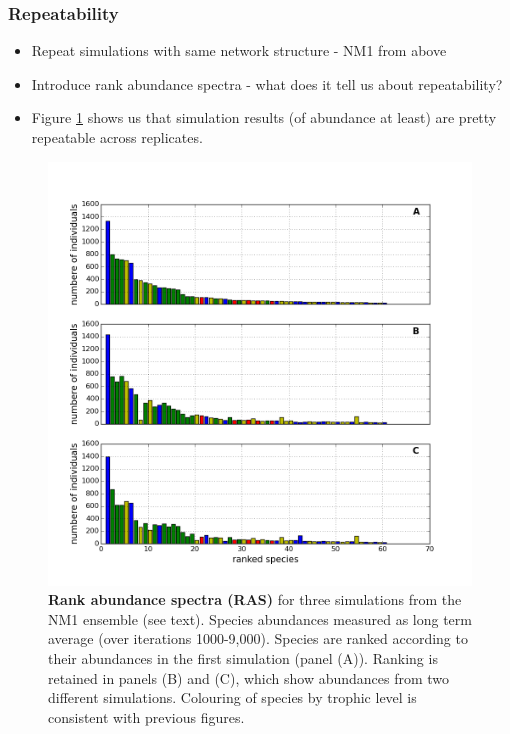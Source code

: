 


\subsubsection{Repeatability}

\begin{itemize}
	\item Repeat simulations with same network structure - NM1 from above
	\item Introduce rank abundance spectra - what does it tell us about repeatability?
	\item Figure \ref{fig:ras_3examples} shows us that simulation results (of abundance at least) are pretty repeatable across replicates.
\end{itemize}


\begin{figure}[hp]
	\centering
	\includegraphics[width=1.0\linewidth]{"./chapters/chapter04b/figures/ras_3examples"}
    \caption{\textbf{Rank abundance spectra (RAS)} for three simulations from the NM1 ensemble (see text). Species abundances measured as long term average (over iterations 1000-9,000). Species are ranked according to their abundances in the first simulation (panel (A)). Ranking is retained in panels (B) and (C), which show abundances from two different simulations. Colouring of species by trophic level is consistent with previous figures.}    
    \label{fig:ras_3examples}
\end{figure}

